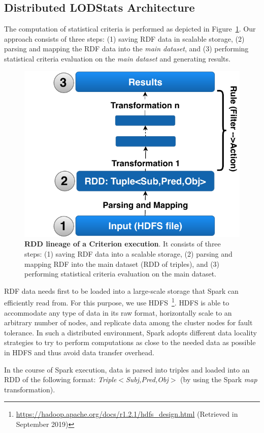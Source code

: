 \subsection{Distributed LODStats Architecture}
The computation of statistical criteria is performed as depicted in Figure~\ref{fig:RDD_Lineage}.
Our approach consists of three steps: (1) saving \gls{RDF} data in scalable storage, (2) parsing and mapping the \gls{RDF} data into the \emph{main dataset}, and (3) performing statistical criteria evaluation on the \emph{main dataset} and generating results.

\begin{figure}
\centering
\includegraphics[width=.45\columnwidth]{images/4_distlodstats/distlodstats-rdd-lineage.pdf}
\caption{\textbf{RDD lineage of a Criterion execution}. 
It consists of three steps: (1) saving RDF data into a scalable storage, (2) parsing and mapping RDF into the main dataset (RDD of triples), and (3) performing statistical criteria evaluation on the main dataset.}
\label{fig:RDD_Lineage}
\end{figure}

 \gls{RDF} data needs first to be loaded into a large-scale storage that Spark can efficiently read from.
For this purpose, we use \gls{HDFS}~\footnote{\scriptsize \url{https://hadoop.apache.org/docs/r1.2.1/hdfs\_design.html} (Retrieved in September 2019)}.
\gls{HDFS} is able to accommodate any type of data in its raw format, horizontally scale to an arbitrary number of nodes, and replicate data among the cluster nodes for fault tolerance.
In such a distributed environment, Spark adopts different data locality strategies to try to perform computations as close to the needed data as possible in \gls{HDFS} and thus avoid data transfer overhead.
 
 In the course of Spark execution, data is parsed into triples and loaded into an \gls{RDD} of the following format: \emph{Triple$<$Subj,Pred,Obj$>$} (by using the Spark \textit{map} transformation).

